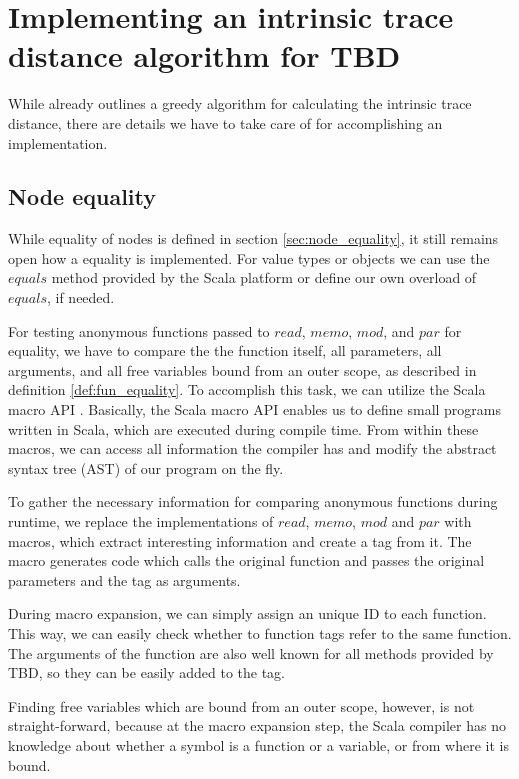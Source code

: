 \section{Implementing an intrinsic trace distance algorithm for TBD}
While \cite{Acar2005thesis} already outlines a greedy algorithm for calculating the intrinsic trace distance, there are details we have to take care of for accomplishing an implementation.

\subsection{Node equality}
While equality of nodes is defined in section \ref{sec:node_equality}, it still remains open how a equality is implemented. For value types or objects we can use the $equals$ method provided by the Scala platform or define our own overload of $equals$, if needed.  

For testing anonymous functions passed to $read$, $memo$, $mod$, and $par$ for equality, we have to compare the the function itself, all parameters, all arguments, and all free variables bound from an outer scope, as described in definition \ref{def:fun_equality}. To accomplish this task, we can utilize the Scala macro API \cite{burmako2013scala}. Basically, the Scala macro API enables us to define small programs written in Scala, which are executed during compile time. From within these macros, we can access all information the compiler has and modify the abstract syntax tree (AST) of our program on the fly. 

To gather the necessary information for comparing anonymous functions during runtime, we replace the implementations of $read$, $memo$, $mod$ and $par$ with macros, which extract interesting information and create a tag from it. The macro generates code which calls the original function and passes the original parameters and the tag as arguments. 

During macro expansion, we can simply assign an unique ID to each function. This way, we can easily check whether to function tags refer to the same function. The arguments of the function are also well known for all methods provided by TBD, so they can be easily added to the tag. 

Finding free variables which are bound from an outer scope, however, is not straight-forward, because at the macro expansion step, the Scala compiler has no knowledge about whether a symbol is a function or a variable, or from where it is bound.

